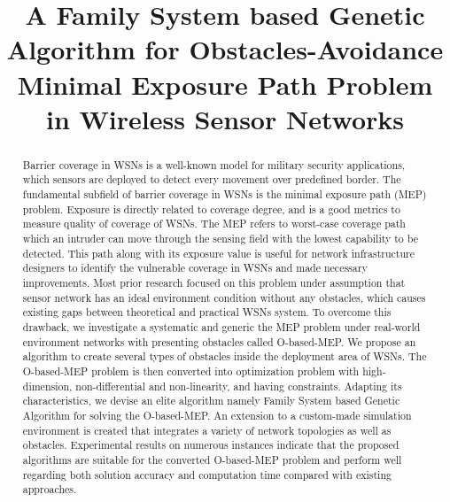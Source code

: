 \documentclass[final]{elsarticle}
\begin{document}
\begin{frontmatter}
\title{A Family System based Genetic Algorithm for  Obstacles-Avoidance Minimal Exposure Path Problem in Wireless Sensor Networks}

%
%
%
\begin{abstract}
Barrier coverage in WSNs is a well-known model for military security applications, which sensors are deployed to detect every movement over predefined border. The fundamental subfield of barrier coverage in WSNs is the minimal exposure path (MEP) problem. Exposure is directly related to coverage degree, and is a good metrics to measure quality of coverage of WSNs. The MEP refers to worst-case coverage path which an intruder can move through the sensing field with the lowest capability to be detected. This path along with its exposure value is useful for network infrastructure designers to identify the vulnerable coverage in WSNs and made necessary improvements. Most prior research focused on this problem under assumption that sensor network has an ideal environment condition without any obstacles, which causes existing gaps between theoretical and practical WSNs system.  To overcome this drawback, we investigate a systematic and generic the MEP problem under real-world environment networks with presenting obstacles called O-based-MEP. We propose an algorithm to create several types of obstacles inside the deployment area of WSNs. The O-based-MEP problem is then converted into optimization problem with high-dimension, non-differential and non-linearity, and having constraints. Adapting its characteristics, we devise an elite algorithm namely Family System based Genetic Algorithm for solving the O-based-MEP. An extension to a custom-made simulation environment is created that integrates a variety of network topologies as well as obstacles. Experimental results on numerous instances indicate that the proposed algorithms are suitable for the converted O-based-MEP problem and perform well regarding both solution accuracy and computation time compared with existing approaches.
  

\end{abstract}
\end{frontmatter}
\end{document}
